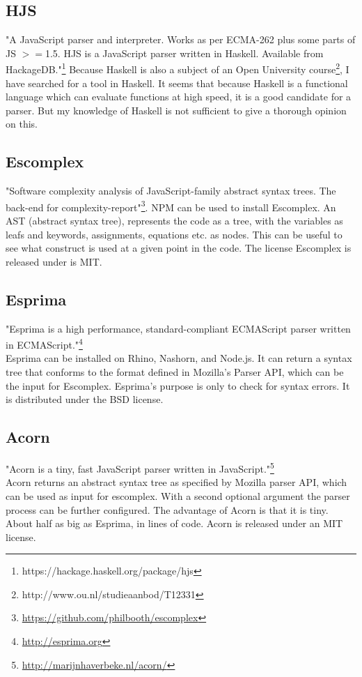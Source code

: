 \documentclass{article}
\begin{document}
\subsection{HJS}
"A JavaScript parser and interpreter. Works as per ECMA-262 plus some parts of JS $>=$1.5.
HJS is a JavaScript parser written in Haskell. Available from HackageDB."\footnote{https://hackage.haskell.org/package/hjs}
Because Haskell is also a subject of an Open University course\footnote{http://www.ou.nl/studieaanbod/T12331}, I have searched for a tool in Haskell.
It seems that because Haskell is a functional language which can evaluate functions at high speed, it is a good candidate for a parser.
But my knowledge of Haskell is not sufficient to give a thorough opinion on this.

\subsection{Escomplex}
"Software complexity analysis of JavaScript-family abstract syntax trees. The back-end for complexity-report"\footnote{\url{https://github.com/philbooth/escomplex}}.
NPM can be used to install Escomplex.
An AST (abstract syntax tree), represents the code as a tree, with the variables as leafs and keywords, assignments, equations etc. as nodes.
This can be useful to see what construct is used at a given point in the code.
The license Escomplex is released under is MIT.

\subsection{Esprima}
"Esprima is a high performance, standard-compliant ECMAScript parser written in ECMAScript."\footnote{\url{http://esprima.org}}\\
Esprima can be installed on Rhino, Nashorn, and Node.js.
It can return a syntax tree that conforms to the format defined in Mozilla's Parser API, which can be the input for Escomplex.
Esprima's purpose is only to check for syntax errors.
It is distributed under the BSD license.

\subsection{Acorn}
"Acorn is a tiny, fast JavaScript parser written in JavaScript."\footnote{\url{http://marijnhaverbeke.nl/acorn/}}\\
Acorn returns an abstract syntax tree as specified by Mozilla parser API, which can be used as input for escomplex.
With a second optional argument the parser process can be further configured.
The advantage of Acorn is that it is tiny. About half as big as Esprima, in lines of code.
Acorn is released under an MIT license.
\end{document}
